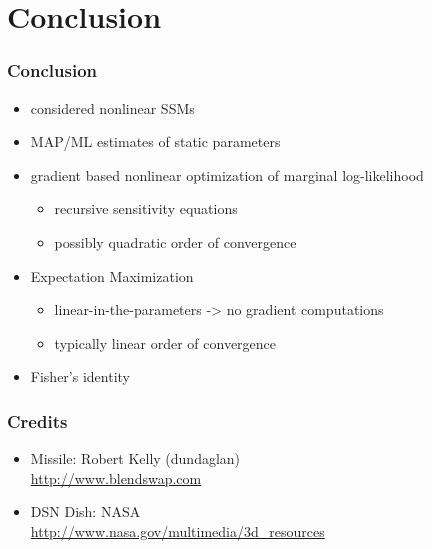 \documentclass[t,professionalfont,10pt]{beamer}
\begin{document}
\section{Conclusion}
\begin{frame}
\frametitle{Conclusion}
	\begin{itemize}
		\item considered nonlinear SSMs
		\item MAP/ML estimates of static parameters
		\item gradient based nonlinear optimization of marginal log-likelihood
		\begin{itemize}
		    \item recursive sensitivity equations
		    \item possibly quadratic order of convergence
		\end{itemize}
		\item Expectation Maximization
		\begin{itemize}
		    \item linear-in-the-parameters -> no gradient computations
		    \item typically linear order of convergence
		\end{itemize}
		\item Fisher's identity
	\end{itemize}
\end{frame}
\begin{frame}
	\frametitle{Credits}
	\begin{itemize}
	  \item Missile: Robert Kelly (dundaglan) \\ \url{http://www.blendswap.com}
	  \item DSN Dish: NASA \\ \url{http://www.nasa.gov/multimedia/3d_resources}
	\end{itemize}
\end{frame}
\end{document}
